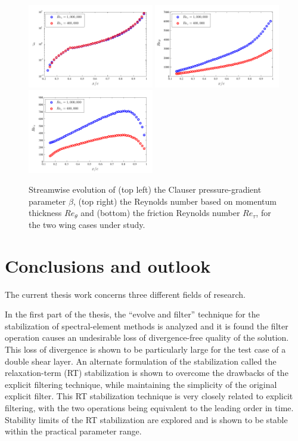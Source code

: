 \begin{figure}[t]
	\centering
	\includegraphics[width=0.49\textwidth]{paper4/imgs/beta_vs_x}
	\includegraphics[width=0.49\textwidth]{paper4/imgs/Reth_vs_x}
	\includegraphics[width=0.49\textwidth]{paper4/imgs/Ret_vs_x}
	\caption{Streamwise evolution of (top left) the Clauser pressure-gradient parameter $\beta$, (top right) the Reynolds number based on momentum thickness $Re_{\theta}$ and (bottom) the friction Reynolds number $Re_{\tau}$, for the two wing cases under study.}
	\label{fig:overview_beta_Reth_Ret}
\end{figure}

\chapter{Conclusions and outlook}

The current thesis work concerns three different fields of research.

In the first part of the thesis, the ``evolve and filter'' technique for the stabilization of spectral-element methods is analyzed and it is found the filter operation causes an undesirable loss of divergence-free quality of the solution. This loss of divergence is shown to be particularly large for the test case of a double shear layer. An alternate formulation of the stabilization called the relaxation-term (RT) stabilization is shown to overcome the drawbacks of the explicit filtering technique, while maintaining the simplicity of the original explicit filter. This RT stabilization technique is very closely related to explicit filtering, with the two operations being equivalent to the leading order in time. Stability limits of the RT stabilization are explored and is shown to be stable within the practical parameter range.

